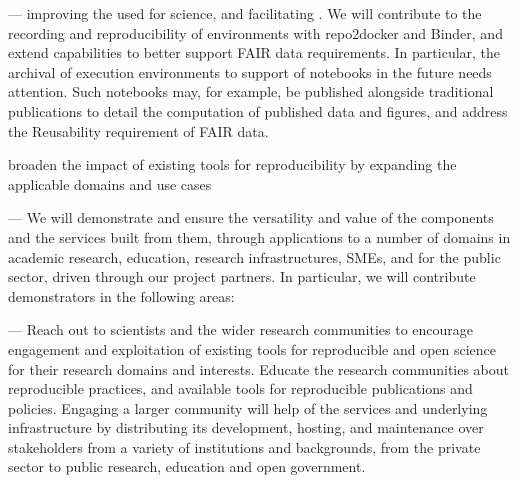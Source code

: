 \begin{compactenum}

\item \label{obj:reproducibility}  ---
  improving the 
  used for science, and facilitating .
  We will contribute to the recording and reproducibility
  of environments with repo2docker and Binder,
  and extend capabilities to better support FAIR
  data requirements. In particular, the archival of execution
  environments to support  of notebooks in the future
  needs attention. Such notebooks may, for example, be published alongside
  traditional publications to detail the computation of published data
  and figures, and address the Reusability requirement of FAIR data.

\item \label{obj:broaden} broaden the impact of existing tools for reproducibility by expanding the applicable domains and use cases
\item \label{obj:demonstrators}
   ---
  We will demonstrate and ensure the versatility and value of the components and
  the services built from them,
  through applications to a number of
  domains in academic research, education, research infrastructures, SMEs, and for
  the public sector, driven through our project partners. In
  particular, we will contribute demonstrators in the following areas:

\item \label{obj:education}
   ---
  Reach out to scientists and the wider research
  communities to encourage engagement
  and exploitation of existing tools for reproducible and open science
  for their research domains and interests.
  Educate the research communities about reproducible practices,
  and available tools for reproducible publications and policies.
  Engaging a larger community will help  of
  the services and underlying infrastructure by distributing its
  development, hosting, and maintenance over stakeholders from a
  variety of institutions and backgrounds,
  from the private sector to public research, education
  and open government.



\end{compactenum}

